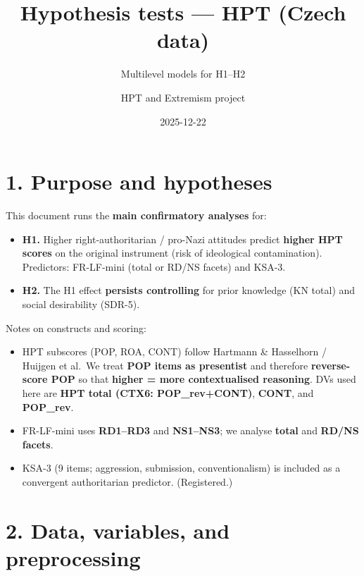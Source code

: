 \documentclass[
  10pt,
]{article}
\title{Hypothesis tests --- HPT (Czech data)}
\subtitle{Multilevel models for H1--H2}
\author{HPT and Extremism project}
\date{2025-12-22}
\providecommand{\tightlist}{%
  \setlength{\itemsep}{0pt}\setlength{\parskip}{0pt}}
\begin{document}
\maketitle

{
\setcounter{tocdepth}{3}
\tableofcontents
}
\hypertarget{purpose-and-hypotheses}{%
\section{1. Purpose and hypotheses}\label{purpose-and-hypotheses}}

This document runs the \textbf{main confirmatory analyses} for:

\begin{itemize}
\tightlist
\item
  \textbf{H1.} Higher right‐authoritarian / pro-Nazi attitudes predict
  \textbf{higher HPT scores} on the original instrument (risk of
  ideological contamination). Predictors: FR-LF-mini (total or RD/NS
  facets) and KSA-3.
\item
  \textbf{H2.} The H1 effect \textbf{persists controlling} for prior
  knowledge (KN total) and social desirability (SDR-5).
\end{itemize}

Notes on constructs and scoring:

\begin{itemize}
\tightlist
\item
  HPT subscores (POP, ROA, CONT) follow Hartmann \& Hasselhorn / Huijgen
  et al.~We treat \textbf{POP items as presentist} and therefore
  \textbf{reverse-score POP} so that \textbf{higher = more
  contextualised reasoning}. DVs used here are \textbf{HPT total (CTX6:
  POP\_rev+CONT)}, \textbf{CONT}, and \textbf{POP\_rev}.
\item
  FR-LF-mini uses \textbf{RD1--RD3} and \textbf{NS1--NS3}; we analyse
  \textbf{total} and \textbf{RD/NS facets}.
\item
  KSA-3 (9 items; aggression, submission, conventionalism) is included
  as a convergent authoritarian predictor. (Registered.)
\end{itemize}

\hypertarget{data-variables-and-preprocessing}{%
\section{2. Data, variables, and
preprocessing}\label{data-variables-and-preprocessing}}
\end{document}
